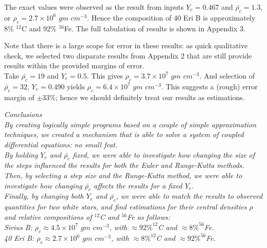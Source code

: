 \documentclass[10pt]{article}
\begin{document}
{\medskip \medskip

The exact values were observed as the result from inputs $Y_e = 0.467$ and $\bar{\rho_c} = 1.3$, or $\rho_c = 2.7 \times 10^6$ $gm$ $cm^{-3}$. Hence the composition of 40 Eri B is approximately 8\% $^{12}$C and 92\% $^{56}$Fe. The full tabulation of results is shown in Appendix 3.

Note that there is a large scope for error in these results: as quick qualitative check, we selected two disparate results from Appendix 2 that are still provide results within the provided margins of error. \\
Take $\bar{\rho_c} = 19$ and $Y_e = 0.5$. This gives $\rho_c = 3.7 \times 10^7$ $gm$ $cm^{-3}$. And selection of $\bar{\rho_c} = 32$, $Y_e = 0.490$ yields $\rho_c = 6.4 \times 10^7$ $gm$ $cm^{-3}$. This suggests a (rough) error margin of $\pm 33\%$; hence we should definitely treat our results as estimations. 

\bigskip \bigskip

\em {Conclusions}\\ \em
By creating logically simple programs based on a couple of simple approximation techniques, we created a mechanism that is able to solve a system of coupled differential equations: no small feat. \\
By holding $Y_e$ and $\bar{\rho_c}$ fixed, we were able to investigate how changing the size of the steps influenced the results for both the Euler and Runge-Kutta methods. Then, by selecting a step size and the Runge-Kutta method, we were able to investigate how changing $\bar{\rho_c}$ affects the results for a fixed $Y_e$. \\
Finally, by changing both $Y_e$ and $\bar{\rho_c}$, we were able to match the results to observed quantities for two white stars, and find estimations for their central densities $\rho$ and relative compositions of $^{12}$C and $^{56}$Fe as follows: \\
Sirius B: $\rho_c \approx 4.5 \times 10^7$ $gm$ $cm^{-3}$, with $\approx 92\% ^{12}$C and $\approx 8\% ^{56}$Fe. \\
40 Eri B: $\rho_c \approx 2.7 \times 10^6$ $gm$ $cm^{-3}$, with $\approx 8\% ^{12}$C and $\approx 92\% ^{56}$Fe. 

\bigskip \bigskip \bigskip
\bigskip \bigskip \bigskip
\bigskip \bigskip \bigskip
\bigskip \bigskip \bigskip
\bigskip \bigskip \bigskip
\bigskip \bigskip \bigskip
\bigskip \bigskip \bigskip
\bigskip \bigskip \bigskip
\bigskip \bigskip \bigskip
\bigskip \bigskip \bigskip
\bigskip \bigskip \bigskip
\bigskip \bigskip \bigskip
\bigskip \bigskip \bigskip

}
\end{document}
